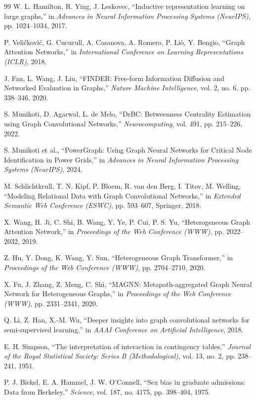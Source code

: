 \documentclass[review]{elsarticle}
\begin{document}
\begin{thebibliography}{99}
 W. L. Hamilton, R. Ying, J. Leskovec, ``Inductive representation learning on
large graphs,'' in \emph{Advances in Neural Information Processing Systems (NeurIPS)}, pp.
1024--1034, 2017.

 P. Veli\v{c}kovi\'{c}, G. Cucurull, A. Casanova, A. Romero, P. Li\`{o},
Y. Bengio, ``Graph Attention Networks,'' in \emph{International Conference on Learning
Representations (ICLR)}, 2018.

 J. Fan, L. Wang, J. Liu, ``FINDER: Free-form Information Diffusion and Networked
Evaluation in Graphs,'' \emph{Nature Machine Intelligence}, vol. 2, no. 6, pp. 338--346, 2020.

 S. Munikoti, D. Agarwal, L. de Melo, ``DrBC: Betweenness Centrality
Estimation using Graph Convolutional Networks,'' \emph{Neurocomputing}, vol. 491, pp. 215--226,
2022.

 S. Munikoti et al., ``PowerGraph: Using Graph Neural Networks for Critical
Node Identification in Power Grids,'' in \emph{Advances in Neural Information Processing Systems
(NeurIPS)}, 2024.

 M. Schlichtkrull, T. N. Kipf, P. Bloem, R. van den Berg, I. Titov,
M. Welling, ``Modeling Relational Data with Graph Convolutional Networks,'' in \emph{Extended
Semantic Web Conference (ESWC)}, pp. 593--607, Springer, 2018.

 X. Wang, H. Ji, C. Shi, B. Wang, Y. Ye, P. Cui, P. S. Yu, ``Heterogeneous Graph
Attention Network,'' in \emph{Proceedings of the Web Conference (WWW)}, pp. 2022--2032, 2019.

 Z. Hu, Y. Dong, K. Wang, Y. Sun, ``Heterogeneous Graph Transformer,'' in
\emph{Proceedings of the Web Conference (WWW)}, pp. 2704--2710, 2020.

 X. Fu, J. Zhang, Z. Meng, C. Shi, ``MAGNN: Metapath-aggregated Graph Neural
Network for Heterogeneous Graphs,'' in \emph{Proceedings of the Web Conference (WWW)}, pp.
2331--2341, 2020.

 Q. Li, Z. Han, X.-M. Wu, ``Deeper insights into graph convolutional networks for
semi-supervised learning,'' in \emph{AAAI Conference on Artificial Intelligence}, 2018.

 E. H. Simpson, ``The interpretation of interaction in contingency tables,''
\emph{Journal of the Royal Statistical Society: Series B (Methodological)}, vol. 13, no. 2, pp.
238--241, 1951.

 P. J. Bickel, E. A. Hammel, J. W. O'Connell, ``Sex bias in graduate
admissions: Data from Berkeley,'' \emph{Science}, vol. 187, no. 4175, pp. 398--404, 1975.

\end{thebibliography}
\end{document}

